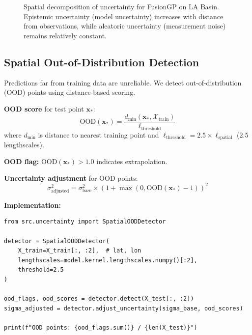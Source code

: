 \documentclass[11pt,letterpaper]{article}
\newcommand{\bx}{\mathbf{x}}
\begin{document}
\begin{figure}[h]
\centering
\caption{Spatial decomposition of uncertainty for FusionGP on LA Basin. Epistemic uncertainty (model uncertainty) increases with distance from observations, while aleatoric uncertainty (measurement noise) remains relatively constant.}
\label{fig:fusiongp_decomposition}
\end{figure}

\subsection{Spatial Out-of-Distribution Detection}

Predictions far from training data are unreliable. We detect out-of-distribution (OOD) points using distance-based scoring.

\textbf{OOD score} for test point $\bx_*$:
\begin{equation}
\text{OOD}(\bx_*) = \frac{d_{\min}(\bx_*, \mathcal{X}_{\text{train}})}{\ell_{\text{threshold}}}
\label{eq:ood_score}
\end{equation}
where $d_{\min}$ is distance to nearest training point and $\ell_{\text{threshold}} = 2.5 \times \ell_{\text{spatial}}$ (2.5 lengthscales).

\textbf{OOD flag:} $\text{OOD}(\bx_*) > 1.0$ indicates extrapolation.

\textbf{Uncertainty adjustment} for OOD points:
\begin{equation}
\sigma^2_{\text{adjusted}} = \sigma^2_{\text{base}} \times \left(1 + \max(0, \text{OOD}(\bx_*) - 1)\right)^2
\label{eq:ood_adjustment}
\end{equation}

\textbf{Implementation:}
\begin{lstlisting}[caption=OOD detection, label=code:ood]
from src.uncertainty import SpatialOODDetector

detector = SpatialOODDetector(
    X_train=X_train[:, :2],  # lat, lon
    lengthscales=model.kernel.lengthscales.numpy()[:2],
    threshold=2.5
)

ood_flags, ood_scores = detector.detect(X_test[:, :2])
sigma_adjusted = detector.adjust_uncertainty(sigma_base, ood_scores)

print(f"OOD points: {ood_flags.sum()} / {len(X_test)}")
\end{lstlisting}
\end{document}
